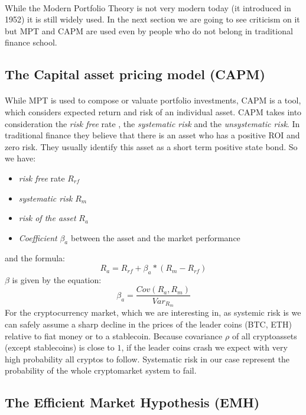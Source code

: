\documentclass{article}
\begin{document}
\paragraph{ }
While the Modern Portfolio Theory is not very modern today (it introduced in 1952) it is still widely used. In the next section we are going to see criticism on it but MPT and CAPM are used even by people who do not belong in traditional finance school.

\subsection{The Capital asset pricing model (CAPM)}
\paragraph{ }
While MPT is used to compose or valuate portfolio investments, CAPM is a tool, which considers expected return and risk of an individual asset. CAPM takes into consideration the \emph{risk free} rate , the \emph{systematic risk} and the \emph{unsystematic risk}. In traditional finance they believe that there is an asset who has a positive ROI and zero risk. They usually identify this asset as a short term positive state bond. So we have:
\begin{itemize}
\item \emph{risk free} rate $R_{rf}$
\item \emph{systematic risk}  $R_{m}$
\item \emph{risk of the asset}  $R_{a}$
\item \emph{Coefficient} $\beta_{a}$ between the asset and the market performance
\end{itemize}
and the formula:
$$R_{a} = R_{rf}+\beta_{a}*(R_{m}-R_{rf})$$
$\beta$ is given by the equation:
$$\beta_{a} = \frac{Cov(R_{a}, R_{m})}{Var_{R_{m}}}$$
For the cryptocurrency market, which we are interesting in, as systemic risk is we can safely assume a sharp decline in the prices of the leader coins (BTC, ETH) relative to fiat money or to a stablecoin. Because covariance $\rho$ of all cryptoassets (except stablecoins) is close to $1$, if the leader coins crash we expect with very high probability all cryptos to follow. Systematic risk in our case represent the probability of the whole cryptomarket system to fail.

\subsection{The Efficient Market Hypothesis (EMH)}
\end{document}
